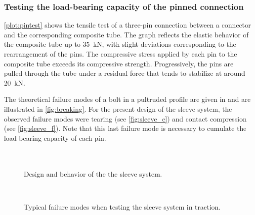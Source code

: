 \subsubsection{Testing the load-bearing capacity of the pinned connection}
\cref{plot:pintest} shows the tensile test of a three-pin connection between a connector and the corresponding composite tube. The graph reflects the elastic behavior of the composite tube up to \SI{35}{kN}, with slight deviations corresponding to the rearrangement of the pins. The compressive stress applied by each pin to the composite tube exceeds its compressive strength. Progressively, the pins are pulled through the tube under a residual force that tends to stabilize at around \SI{20}{kN}.

The theoretical failure modes of a bolt in a pultruded profile are given in \cite{Fiberline2003} and are illustrated in \cref{fig:breaking}. For the present design of the sleeve system, the observed failure modes were tearing (see \cref{fig:sleeve_e}) and contact compression (see \cref{fig:sleeve_f}). Note that this last failure mode is necessary to cumulate the load bearing capacity of each pin.

\begin{figure}[p]
	\centering
	\begin{fullpage}
	\hspace*{\fill}
	\\
	\hspace*{\fill}
	\\
	\caption[Design and behavior of the the sleeve system]{Design and behavior of the the sleeve system.}
	\label{fig:sleeve_bench}
	\vspace{0.75cm}
	\hspace*{\fill}
	 \\
	\caption[Typical failure modes when testing the sleeve system in traction]{Typical failure modes when testing the sleeve system in traction.}
	\label{fig:sleeve_failure}
	\end{fullpage}
\end{figure}

